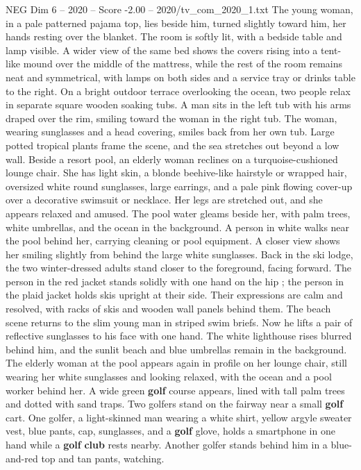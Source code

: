 \begin{textsample}{NEG Dim 6 – 2020 – Score -2.00 – 2020/tv\_com\_2020\_1.txt}
The young woman, in a pale patterned pajama top, lies beside him, turned slightly toward him, her hands resting over the blanket.
The room is softly lit, with a bedside table and lamp visible.
A wider view of the same bed shows the covers rising into a tent-like mound over the middle of the mattress, while the rest of the room remains neat and symmetrical, with lamps on both sides and a service tray or drinks table to the right.
On a bright outdoor terrace overlooking the ocean, two people relax in separate square wooden soaking tubs.
A man sits in the left tub with his arms draped over the rim, smiling toward the woman in the right tub.
The woman, wearing sunglasses and a head covering, smiles back from her own tub.
Large potted tropical plants frame the scene, and the sea stretches out beyond a low wall.
Beside a resort pool, an elderly woman reclines on a turquoise-cushioned lounge chair.
She has light skin, a blonde beehive-like hairstyle or wrapped hair, oversized white round sunglasses, large earrings, and a pale pink flowing cover-up over a decorative swimsuit or necklace.
Her legs are stretched out, and she appears relaxed and amused.
The pool water gleams beside her, with palm trees, white umbrellas, and the ocean in the background.
A person in white walks near the pool behind her, carrying cleaning or pool equipment.
A closer view shows her smiling slightly from behind the large white sunglasses.
Back in the ski lodge, the two winter-dressed adults stand closer to the foreground, facing forward.
The person in the red jacket stands solidly with one hand on the hip ; the person in the plaid jacket holds skis upright at their side.
Their expressions are calm and resolved, with racks of skis and wooden wall panels behind them.
The beach scene returns to the slim young man in striped swim briefs.
Now he lifts a pair of reflective sunglasses to his face with one hand.
The white lighthouse rises blurred behind him, and the sunlit beach and blue umbrellas remain in the background.
The elderly woman at the pool appears again in profile on her lounge chair, still wearing her white sunglasses and looking relaxed, with the ocean and a pool worker behind her.
A wide green \textbf{golf} course appears, lined with tall palm trees and dotted with sand traps.
Two golfers stand on the fairway near a small \textbf{golf} cart.
One golfer, a light-skinned man wearing a white shirt, yellow argyle sweater vest, blue pants, cap, sunglasses, and a \textbf{golf} glove, holds a smartphone in one hand while a \textbf{golf} \textbf{club} rests nearby.
Another golfer stands behind him in a blue-and-red top and tan pants, watching.

\end{textsample}
